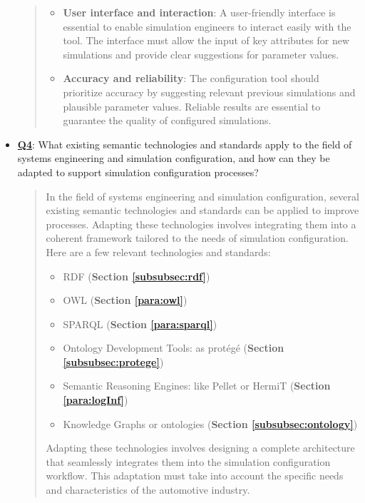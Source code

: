 \begin{itemize}
\begin{quote}
\begin{itemize}
            \item \textbf{User interface and interaction}: A user-friendly interface is essential to enable simulation engineers to interact easily with the tool. The interface must allow the input of key attributes for new simulations and provide clear suggestions for parameter values.\\
            
            \item \textbf{Accuracy and reliability}: The configuration tool should prioritize accuracy by suggesting relevant previous simulations and plausible parameter values. Reliable results are essential to guarantee the quality of configured simulations.\\
        \end{itemize}
    \end{quote}
    
    \item \hyperref[Q4]{\textbf{Q4}}: What existing semantic technologies and standards apply to the field of systems engineering and simulation configuration, and how can they be adapted to support simulation configuration processes?
    
    \begin{quote}
        In the field of systems engineering and simulation configuration, several existing semantic technologies and standards can be applied to improve processes. Adapting these technologies involves integrating them into a coherent framework tailored to the needs of simulation configuration. Here are a few relevant technologies and standards:
         \begin{itemize}
             \item RDF (\textbf{Section \ref{subsubsec:rdf}})
             \item OWL (\textbf{Section \ref{para:owl}})
             \item SPARQL (\textbf{Section \ref{para:sparql}})
             \item Ontology Development Tools: as protégé (\textbf{Section \ref{subsubsec:protege}})
             \item Semantic Reasoning Engines: like Pellet or HermiT (\textbf{Section \ref{para:logInf}})
             \item Knowledge Graphs or ontologies (\textbf{Section \ref{subsubsec:ontology}})\\
         \end{itemize}
        
        Adapting these technologies involves designing a complete architecture that seamlessly integrates them into the simulation configuration workflow. This adaptation must take into account the specific needs and characteristics of the automotive industry.
    \end{quote}
\end{itemize}


